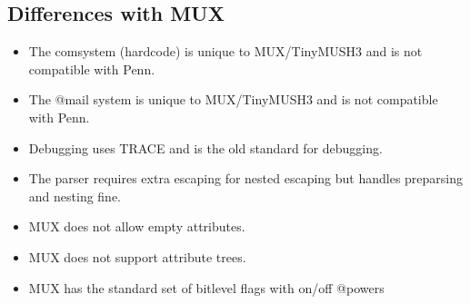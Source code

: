 \documentclass[letterpaper,10pt,english]{sphinxmanual}
\begin{document}
\subsection{Differences with MUX}
\label{\detokenize{differences:differences-with-mux}}\begin{itemize}
\item {} 
\sphinxAtStartPar
The comsystem (hardcode) is unique to MUX/TinyMUSH3 and is not compatible with Penn.

\item {} 
\sphinxAtStartPar
The @mail system is unique to MUX/TinyMUSH3 and is not compatible with Penn.

\item {} 
\sphinxAtStartPar
Debugging uses TRACE and is the old standard for debugging.

\item {} 
\sphinxAtStartPar
The parser requires extra escaping for nested escaping but handles pre\sphinxhyphen{}parsing and nesting fine.

\item {} 
\sphinxAtStartPar
MUX does not allow empty attributes.

\item {} 
\sphinxAtStartPar
MUX does not support attribute trees.

\item {} 
\sphinxAtStartPar
MUX has the standard set of bitlevel flags with on/off @powers

\end{itemize}
\end{document}
